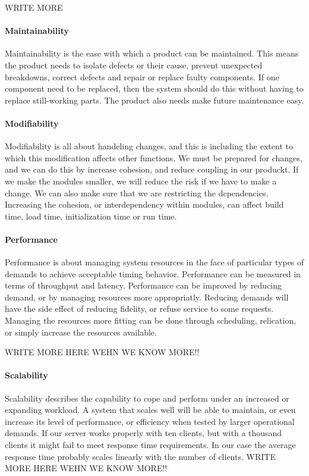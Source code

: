 WRITE MORE

\paragraph{Maintainability}
Maintainability is the ease with which a product can be maintained. This means the product needs to isolate defects or their cause, prevent unexpected breakdowns, correct defects and repair or replace faulty components. If one component need to be replaced, then the system should do this without having to replace still-working parts. The product also needs make future maintenance easy.

\paragraph{Modifiability}

Modifiability is all about handeling changes, and this is including the extent to which this modification affects other functions. 
We must be prepared for changes, and we can do this  by increase cohesion, and reduce coupling in our produckt. 
If we make the modules smaller, we will reduce the risk if we have to make a change. 
We can also make sure that we are restricting the dependencies. 
Increasing the cohesion, or interdependency within modules, can affect build time, load time, initialization time or run time.

\paragraph{Performance}
Performance is about managing system resources in the face of particular types of demands to achieve acceptable timing behavior. 
Performance can be measured in terms of throughput and latency. 
Performance can be improved by reducing demand, or by managing resources more appropriatly. 
Reducing demands will have the side effect of reducing fidelity, or refuse service to some requests. 
Managing the resources more fitting can be done through scheduling, relication, or simply increase the resources available.

WRITE MORE HERE WEHN WE KNOW MORE!!

\paragraph{Scalability}
 Scalability describes the capability to cope and perform under an increased or expanding workload. A system that scales well will be able to maintain, or even increase its level of performance, or efficiency when tested by larger operational demands.
 If our server works properly with ten clients, but with a thousand clients it might fail to meet response time requirements.
 In our case the average response time probably scales linearly with the number of clients.
 WRITE MORE HERE WEHN WE KNOW MORE!!

